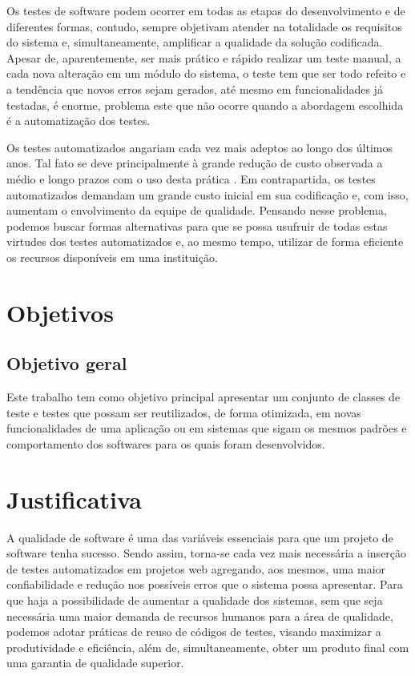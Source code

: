 \documentclass[tg]{mdtufsm}
\begin{document}
Os testes de software podem ocorrer em todas as etapas do desenvolvimento e de diferentes formas, contudo,
sempre objetivam atender na totalidade os requisitos do sistema e, simultaneamente, amplificar a qualidade da solução
codificada. Apesar de, aparentemente, ser mais prático e rápido realizar um teste manual, a cada nova alteração em um módulo do sistema,
o teste tem que ser todo refeito e a tendência que novos erros sejam gerados, até mesmo em funcionalidades já testadas, é enorme,
problema este que não ocorre quando a abordagem escolhida é a automatização dos testes. 

Os testes automatizados angariam cada vez mais adeptos ao longo dos últimos anos. Tal fato se deve principalmente à grande redução de custo observada a médio e longo prazos com o uso desta prática \cite{de2007utilizaccao}. Em contrapartida, os testes automatizados demandam um grande custo inicial em sua codificação e, com isso, aumentam o
envolvimento da equipe de qualidade. Pensando nesse problema, podemos buscar formas alternativas para que se possa usufruir de todas estas virtudes dos testes automatizados e, ao mesmo tempo, utilizar de forma eficiente os recursos disponíveis em uma instituição.

\section{Objetivos}

\subsection{Objetivo geral}

Este trabalho tem como objetivo principal apresentar um conjunto de classes de teste e testes que possam ser reutilizados, de forma otimizada, em novas funcionalidades de uma aplicação ou em sistemas que sigam os mesmos padrões e comportamento dos softwares para os quais foram desenvolvidos.

\section{Justificativa}

A qualidade de software  é uma das variáveis essenciais para que um projeto de software tenha sucesso.
Sendo assim, torna-se cada vez mais necessária a inserção de testes automatizados em projetos web agregando, aos mesmos, uma maior confiabilidade e redução nos possíveis
erros que o sistema possa apresentar. Para que haja a possibilidade de aumentar a qualidade dos sistemas, sem que seja necessária uma maior
demanda de recursos humanos para a área de qualidade, podemos adotar práticas de reuso de códigos de testes, visando
maximizar a produtividade e eficiência, além de, simultaneamente, obter um produto final com uma garantia de qualidade
superior.
\end{document}
